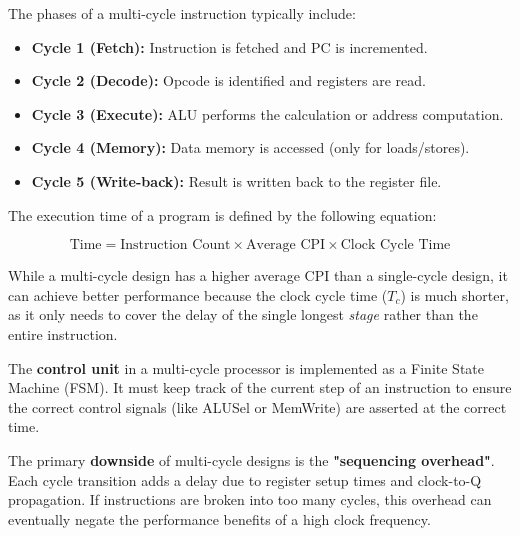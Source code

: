 \begin{example}
The phases of a multi-cycle instruction typically include:
\begin{itemize}
    \item \textbf{Cycle 1 (Fetch):} Instruction is fetched and PC is incremented.
    \item \textbf{Cycle 2 (Decode):} Opcode is identified and registers are read.
    \item \textbf{Cycle 3 (Execute):} ALU performs the calculation or address computation.
    \item \textbf{Cycle 4 (Memory):} Data memory is accessed (only for loads/stores).
    \item \textbf{Cycle 5 (Write-back):} Result is written back to the register file.
\end{itemize}
\end{example}

\begin{theorem}
The execution time of a program is defined by the following equation:

$$\text{Time} = \text{Instruction Count} \times \text{Average CPI} \times \text{Clock Cycle Time}$$

While a multi-cycle design has a higher average CPI than a single-cycle design, it can achieve better performance because the clock cycle time ($T_c$) is much shorter, as it only needs to cover the delay of the single longest \textit{stage} rather than the entire instruction.
\end{theorem}

\begin{remark}
The \textbf{control unit} in a multi-cycle processor is implemented as a Finite State Machine (FSM). It must keep track of the current step of an instruction to ensure the correct control signals (like ALUSel or MemWrite) are asserted at the correct time.
\end{remark}

\begin{lemma}
The primary \textbf{downside} of multi-cycle designs is the \textbf{"sequencing overhead"}. Each cycle transition adds a delay due to register setup times and clock-to-Q propagation. If instructions are broken into too many cycles, this overhead can eventually negate the performance benefits of a high clock frequency.
\end{lemma}